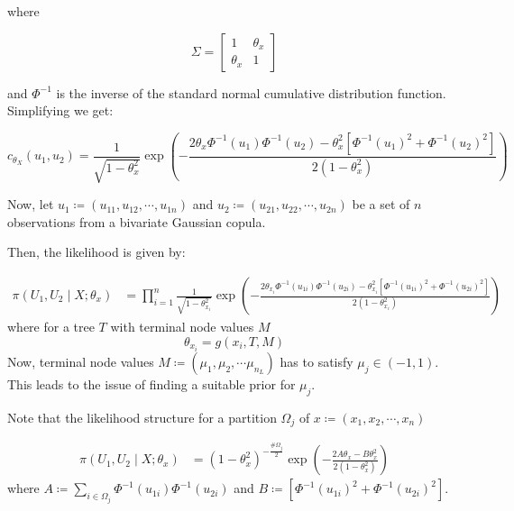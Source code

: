 \documentclass{amsart}
\begin{document}
where

\[
\Sigma = \begin{bmatrix}
1 & \theta_x \\
\theta_x & 1
\end{bmatrix}
\]

and \( \Phi^{-1} \) is the inverse of the standard normal cumulative distribution function. Simplifying we get:

\begin{equation}
    c_{\theta_X}(u_1, u_2) = \frac{1}{\sqrt{1 - \theta_x^2}} \exp \left( -\frac{2\theta_x \Phi^{-1}(u_1) \Phi^{-1}(u_2) - \theta_x^2\left[\Phi^{-1}(u_1)^2 + \Phi^{-1}(u_2)^2\right]}{2(1 - \theta_x^2)} \right)
\end{equation}

Now, let $u_1 \coloneqq (u_{11}, u_{12}, \cdots, u_{1n})$ and $u_2 \coloneqq (u_{21}, u_{22}, \cdots, u_{2n})$ be a set of $n$ observations from a bivariate
Gaussian copula.


Then, the likelihood is given by:

\begin{align}
    \pi(U_1, U_2\mid X;\theta_x) &=\prod_{i=1}^n  
    \frac{1}{\sqrt{1 - \theta_{x_i}^2}} \exp \left( -\frac{2\theta_{x_i} \Phi^{-1}(u_{1i}) \Phi^{-1}(u_{2i}) - \theta_{x_i}^2\left[\Phi^{-1}(u_{1i})^2 + \Phi^{-1}(u_{2i})^2\right]}{2(1 - \theta_{x_i}^2)} \right)
\end{align}
where for a tree $T$ with terminal node values $M$
\begin{equation}
    \theta_{x_i} = g(x_i, T, M)
\end{equation}
Now, terminal node values $M \coloneqq (\mu_1, \mu_2, \cdots \mu_{n_L})$ has to
satisfy $\mu_j \in (-1,1)$. This leads to the issue of finding a suitable prior 
for $\mu_j$.

Note that the likelihood structure for a partition $\Omega_j$ of $x\coloneqq (x_1, x_2, \cdots, x_n)$

\begin{align}
    \pi(U_1, U_2\mid X;\theta_x) 
    &=(1 - \theta_{x}^2)^{-\frac{\#\Omega_j}{2}} \exp \left( -\frac{2A \theta_{x} - B\theta_{x}^2}{2(1 - \theta_{x}^2)} \right)
\end{align}
where $A \coloneqq \sum_{i\in \Omega_j}\Phi^{-1}(u_{1i}) \Phi^{-1}(u_{2i})$
and $B \coloneqq \left[\Phi^{-1}(u_{1i})^2 + \Phi^{-1}(u_{2i})^2\right]$. 
\end{document}
